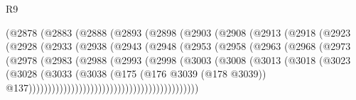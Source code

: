 \begin{lexlean}{R9}
\begin{coremodule}
                        (@2878
                          (@2883
                            (@2888
                              (@2893
                                (@2898
                                  (@2903
                                    (@2908
                                      (@2913
                                        (@2918
                                          (@2923
                                            (@2928
                                              (@2933
                                                (@2938
                                                  (@2943
                                                    (@2948
                                                      (@2953
                                                        (@2958
                                                          (@2963
                                                            (@2968
                                                              (@2973
                                                                (@2978
                                                                  (@2983
                                                                    (@2988
                                                                      (@2993
                                                                        (@2998
                                                                          (@3003
                                                                            (@3008
                                                                              (@3013
                                                                                (@3018
                                                                                  (@3023
                                                                                    (@3028
                                                                                      (@3033
                                                                                        (@3038
                                                                                          (@175
                                                                                            (@176
                                                                                              @3039
                                                                                              (@178
                                                                                                @3039))
                                                                                            @137))))))))))))))))))))))))))))))))))))))))))))

\end{coremodule}
\end{lexlean}
